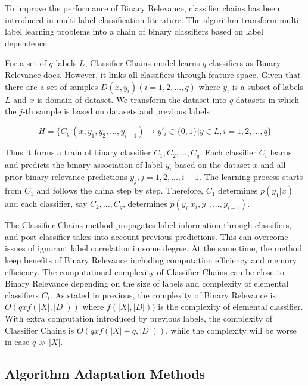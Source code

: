 To improve the performance of Binary Relevance, classifier chains has been introduced in multi-label classification literature\citep{read2011classifier}. The algorithm transform multi-label learning problems into a chain of binary classifiers based on label dependence.

For a set of $q$ labels $L$, Classifier Chains model learns $q$ classifiers as Binary Relevance does. However, it links all classifiers through feature space. Given that there are a set of samples $D(x,y_{i}) (i = 1,2,...,q)$ where $y_{i}$ is a subset of labels $L$ and $x$ is domain of dataset. We transform the dataset into $q$ datasets in which the $j$-th sample is based on datasets and previous labels

\begin{equation}\label{eq:ClassifierChains}
H = \{C_{y_{i}}(x, y_{1},y_{2},...,y_{i-1}) \to y'_{i} \in \{0,1\}| y \in L, i = 1,2,...,q\}
\end{equation}

Thus it forms a train of binary classifier $C_{1},C_{2},...,C_{q}$. Each classifier $C_{i}$ learns and predicts the binary association of label $y_{i}$ based on the dataset $x$ and all prior binary relevance predictions $y_{j}, j = 1,2,...,i-1$. The learning process starts from $C_{1}$ and follows the china step by step. Therefore, $C_{1}$ determines $p(y_{1}|x)$ and each classifier, say $C_{2},...,C_{q}$, determines $p(y_{i}|x_{i},y_{1},...,y_{i-1})$.

The Classifier Chains method propagates label information through classifiers, and post classifier takes into account previous predictions. This can overcome issues of ignorant label correlation in some degree. At the same time, the method keep benefits of Binary Relevance including computation efficiency and memory efficiency. The computational complexity of Classifier Chains can be close to Binary Relevance depending on the size of labels and complexity of elemental classifiers $C_{i}$. As stated in previous, the complexity of Binary Relevance is $O(qxf(|X|,|D|))$ where $f(|X|,|D|))$ is the complexity of elemental classifier. With extra computation introduced by previous labels, the complexity of Classifier Chains is $O(qxf(|X|+q,|D|))$, while the complexity will be worse in case $q \gg |X|$.

\subsection{Algorithm Adaptation Methods}

